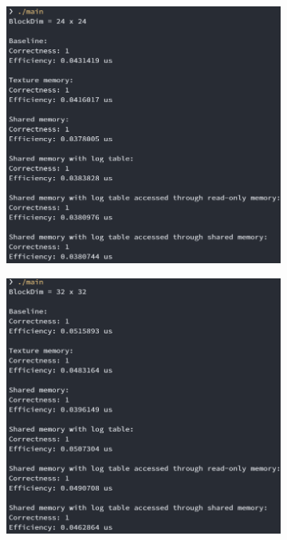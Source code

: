 \documentclass[UTF8, a4paper, 11pt]{article}
\begin{document}
\begin{figure}[H]
\begin{center}
\begin{subfigure}[b]{0.48\linewidth}
\end{subfigure}
\begin{subfigure}[b]{0.48\linewidth}
    \includegraphics[width=\textwidth]{24.png}
\end{subfigure}
\begin{subfigure}[b]{0.48\linewidth}
    \includegraphics[width=\textwidth]{32.png}
\end{subfigure}
\end{center}
\end{figure}
\end{document}
